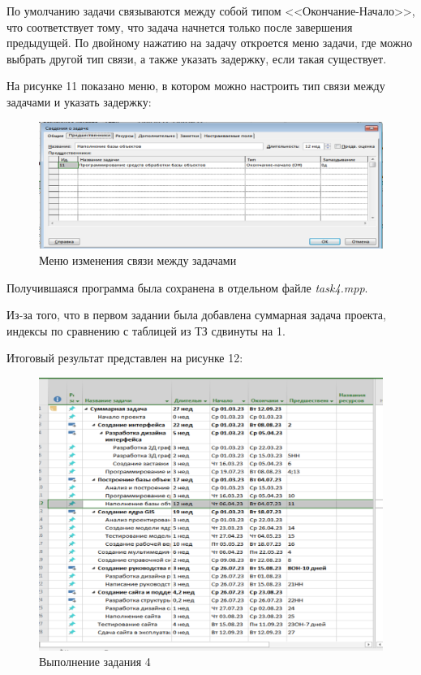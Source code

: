 По умолчанию задачи связываются между собой типом <<Окончание-Начало>>, что соответствует тому, что задача начнется только после завершения предыдущей. 
По двойному нажатию на задачу откроется меню задачи, где можно выбрать другой тип связи, а также указать задержку, если такая существует.

На рисунке 11 показано меню, в котором можно настроить тип связи между задачами и указать задержку:
\FloatBarrier
\begin{figure}[h]	
	\begin{center}
		\includegraphics[width=\linewidth]{inc/4-1.png}
	\end{center}
	\captionsetup{justification=centering}
	\caption{Меню изменения связи между задачами}
\end{figure}
\FloatBarrier


\newpage
Получившаяся программа была сохранена в отдельном файле \textit{task4.mpp}.

Из-за того, что в первом задании была добавлена суммарная задача проекта, индексы по сравнению с таблицей из ТЗ сдвинуты на 1.

Итоговый результат представлен на рисунке 12:
\FloatBarrier
\begin{figure}[h]	
	\begin{center}
		\includegraphics[width=\linewidth]{inc/4-2.png}
	\end{center}
	\captionsetup{justification=centering}
	\caption{Выполнение задания 4}
\end{figure}
\FloatBarrier

